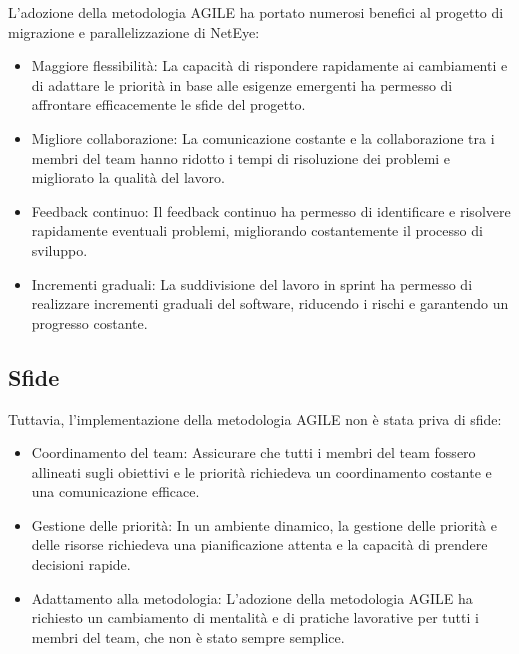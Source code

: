 L'adozione della metodologia AGILE ha portato numerosi benefici al progetto di migrazione
e parallelizzazione di NetEye:
\begin{itemize}
  \item Maggiore flessibilità: La capacità di rispondere rapidamente ai
    cambiamenti e di adattare le priorità in base alle esigenze emergenti ha
    permesso di affrontare efficacemente le sfide del progetto.

  \item Migliore collaborazione: La comunicazione costante e la collaborazione
    tra i membri del team hanno ridotto i tempi di risoluzione dei problemi e
    migliorato la qualità del lavoro.

  \item Feedback continuo: Il feedback continuo ha permesso di identificare e
    risolvere rapidamente eventuali problemi, migliorando costantemente il processo
    di sviluppo.

  \item Incrementi graduali: La suddivisione del lavoro in sprint ha permesso di
    realizzare incrementi graduali del software, riducendo i rischi e garantendo
    un progresso costante.
\end{itemize}

\subsection{Sfide}
\label{sub:sfide}

Tuttavia, l'implementazione della metodologia AGILE non è stata priva di sfide:
\begin{itemize}
  \item Coordinamento del team: Assicurare che tutti i membri del team fossero
    allineati sugli obiettivi e le priorità richiedeva un coordinamento costante
    e una comunicazione efficace.

  \item Gestione delle priorità: In un ambiente dinamico, la gestione delle priorità
    e delle risorse richiedeva una pianificazione attenta e la capacità di prendere
    decisioni rapide.

  \item Adattamento alla metodologia: L'adozione della metodologia AGILE ha
    richiesto un cambiamento di mentalità e di pratiche lavorative per tutti i
    membri del team, che non è stato sempre semplice.
\end{itemize}